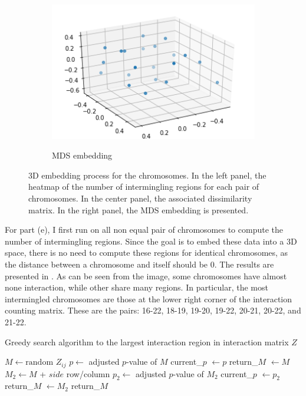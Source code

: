 \documentclass[11pt, english, twocolumn]{article}
\begin{document}
\begin{figure}[t]
\begin{subfigure}{0.3\textwidth}
		\label{fig:dissimilarity-matrix}
	\end{subfigure}
	\begin{subfigure}{0.3\textwidth}
		\includegraphics[width=\textwidth]{MDS_embedding}\\
		\caption{MDS embedding}
		\label{fig:MDS-embedding}
	\end{subfigure}
			\caption{3D embedding process for the chromosomes. In the left panel, the heatmap of the number of intermingling regions for each pair of chromosomes. In the center panel, the associated dissimilarity matrix. In the right panel, the MDS embedding is presented.}
\end{figure}

For part (e), I first run  on all non equal pair of chromosomes to compute the number of intermingling regions. Since the goal is to embed these data into a 3D space, there is no need to compute these regions for identical chromosomes, as the distance between a chromosome and itself should be 0. The results are presented in . As can be seen from the image, some chromosomes have almost none interaction, while other share many regions. In particular, the most intermingled chromosomes are those at the lower right corner of the interaction counting matrix. These are the pairs: 16-22, 18-19, 19-20, 19-22, 20-21, 20-22, and 21-22.

\begin{algorithm}[H]
	\caption{Greedy search algorithm to the largest interaction region in interaction matrix $Z$}
	\label{alg:greedy-search}\vspace{1ex}
	\begin{algorithmic}
		\State $M \gets \text{random } Z_{ij}$
		\State $p \gets $ adjusted $p$-value of $M$
		\State current\_$p$ $\gets p$
		\State return\_$M$ $\gets M$
				\State $M_{2} \gets M$ + $side$ row/column
				\State $p_{2} \gets $ adjusted $p$-value of $M_{2}$
					\State current\_$p$ $\gets p_{2}$
					\State return\_$M$ $\gets M_{2}$
				\EndIf
			\EndFor
		\EndWhile
		\State\Return return\_$M$
	\EndFunction
	\end{algorithmic}
\end{algorithm}
\end{document}
